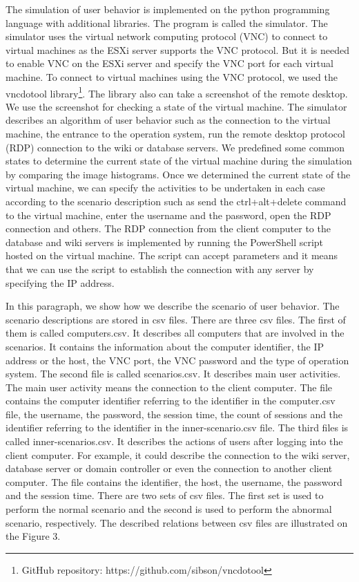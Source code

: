 The simulation of user behavior is implemented on the python programming language with additional libraries. The program is called the simulator. The simulator uses the virtual network computing protocol (VNC) to connect to virtual machines as the ESXi server supports the VNC protocol. But it is needed to enable VNC on the ESXi server and specify the VNC port for each virtual machine. To connect to virtual machines using the VNC protocol, we used the vncdotool library\footnote{GitHub repository: https://github.com/sibson/vncdotool}. The library also can take a screenshot of the remote desktop. We use the screenshot for checking a state of the virtual machine. The simulator describes an algorithm of user behavior such as the connection to the virtual machine, the entrance to the operation system, run the remote desktop protocol (RDP) connection to the wiki or database servers. We predefined some common states to determine the current state of the virtual machine during the simulation by comparing the image histograms. Once we determined the current state of the virtual machine, we can specify the activities to be undertaken in each case according to the scenario description such as send the ctrl+alt+delete command to the virtual machine, enter the username and the password, open the RDP connection and others. The RDP connection from the client computer to the database and wiki servers is implemented by running the PowerShell script hosted on the virtual machine. The script can accept parameters and it means that we can use the script to establish the connection with any server by specifying the IP address.

In this paragraph, we show how we describe the scenario of user behavior. The scenario descriptions are stored in csv files. There are three csv files. The first of them is called computers.csv. It describes all computers that are involved in the scenarios. It contains the information about the computer identifier, the IP address or the host, the VNC port, the VNC password and the type of operation system.
The second file is called scenarios.csv. It describes main user activities. The main user activity means the connection to the client computer. The file contains the computer identifier referring to the identifier in the computer.csv file, the username, the password, the session time, the count of sessions and the identifier referring to the identifier in the inner-scenario.csv file. The third files is called inner-scenarios.csv. It describes the actions of users after logging into the client computer. For example, it could describe the connection to the wiki server, database server or domain controller or even the connection to another client computer. The file contains the identifier, the host, the username, the password and the session time. There are two sets of csv files. The first set is used to perform the normal scenario and the second is used to perform the abnormal scenario, respectively. The described relations between csv files are illustrated on the Figure 3.
 	
